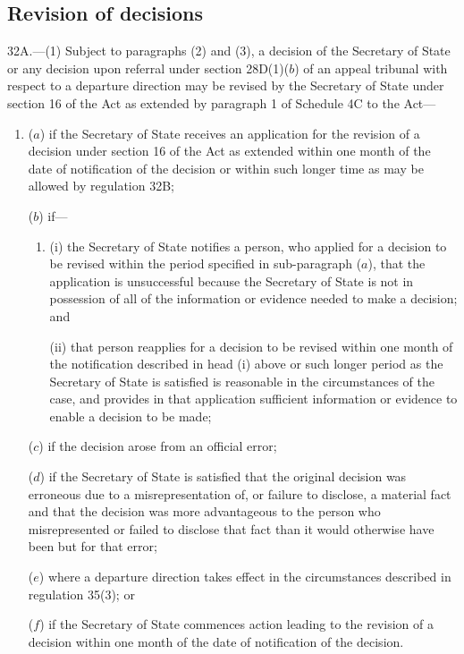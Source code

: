 \documentclass[12pt,a4paper]{article}
\begin{document}

\subsection[32A. Revision of decisions]{Revision of decisions}

32A.—(1) Subject to paragraphs (2) and (3), a decision of the Secretary of State or any decision upon referral under section 28D(1)($b$) of an appeal tribunal with respect to a departure direction may be revised by the Secretary of State under section 16 of the Act as extended by paragraph 1 of Schedule 4C to the Act---
\begin{enumerate}\item[]
($a$) if the Secretary of State receives an application for the revision of a decision under section 16 of the Act as extended within one month of the date of notification of the decision or within such longer time as may be allowed by regulation 32B;

($b$) if---
\begin{enumerate}\item[]
(i) the Secretary of State notifies a person, who applied for a decision to be revised within the period specified in sub-paragraph ($a$), that the application is unsuccessful because the Secretary of State is not in possession of all of the information or evidence needed to make a decision; and

(ii) that person reapplies for a decision to be revised within one month of the notification described in head (i) above or such longer period as the Secretary of State is satisfied is reasonable in the circumstances of the case, and provides in that application sufficient information or evidence to enable a decision to be made;
\end{enumerate}

($c$) if the decision arose from an official error;

($d$) if the Secretary of State is satisfied that the original decision was erroneous due to a misrepresentation of, or failure to disclose, a material fact and that the decision was more advantageous to the person who misrepresented or failed to disclose that fact than it would otherwise have been but for that error;

($e$) where a departure direction takes effect in the circumstances described in regulation 35(3); or

($f$) if the Secretary of State commences action leading to the revision of a decision within one month of the date of notification of the decision.
\end{enumerate}
\end{document}
